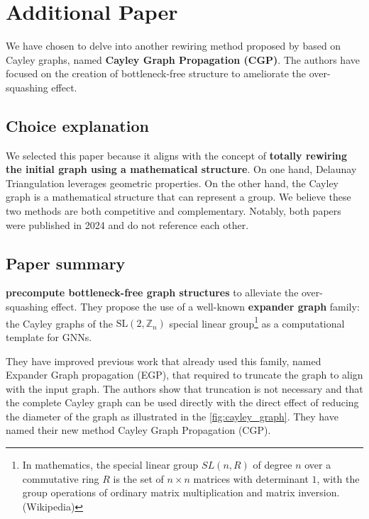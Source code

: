 \documentclass{article}
\theoremstyle{plain}
\theoremstyle{definition}
\theoremstyle{remark}
\begin{document}
\section{Additional Paper}
We have chosen to delve into another rewiring method proposed by \cite{wilson2024cayleygraphpropagation}
based on Cayley graphs, named \textbf{Cayley Graph Propagation (CGP)}. 
The authors have focused on the creation of bottleneck-free
structure to ameliorate the over-squashing effect. 

\subsection{Choice explanation}
We selected this paper because it aligns with the concept of \textbf{totally rewiring
the initial graph using a mathematical structure}.
On one hand, Delaunay Triangulation leverages geometric properties. 
On the other hand, the Cayley graph is a mathematical structure that can represent a group.
We believe these two methods are both competitive and complementary.
Notably, both papers were published in 2024 and do not reference each other.

\subsection{Paper summary}
\cite{wilson2024cayleygraphpropagation} \textbf{precompute bottleneck-free graph structures} to alleviate the
over-squashing effect. They propose the use of a well-known \textbf{expander graph} family:
the Cayley graphs of the $\text{SL}(2,\mathbb{Z}_n)$ special linear group\footnote{
    In mathematics, the special linear group $SL(n, R)$ of degree $n$ over a 
    commutative ring $R$ is the set of $n \times n$ matrices with determinant $1$,
     with the group operations of ordinary matrix multiplication and matrix inversion. (Wikipedia)} as a computational template for GNNs.

They have improved previous work that already used this family, named Expander 
Graph propagation (EGP), that required to 
truncate the graph to align with the input graph. The authors show that truncation is
not necessary and that the complete Cayley graph can be used directly with 
the direct effect of reducing the diameter of the graph as illustrated in the \cref{fig:cayley_graph}.
They have named their new method Cayley Graph Propagation (CGP).
\end{document}
